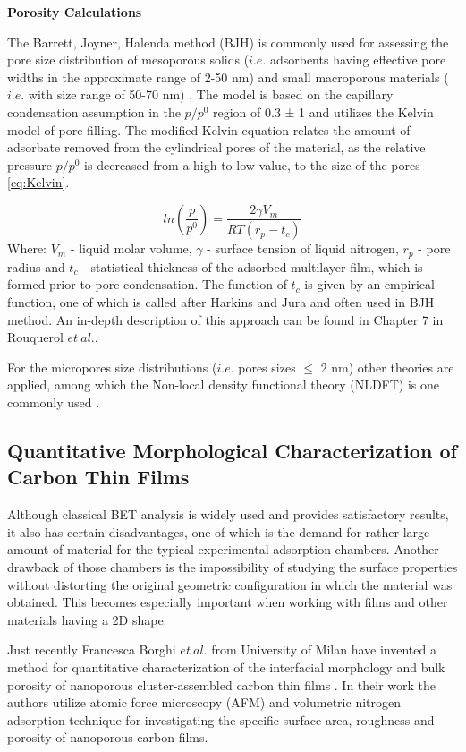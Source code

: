 \medskip
\textbf{Porosity Calculations}

The Barrett, Joyner, Halenda method (BJH) is commonly used for assessing the pore size distribution of mesoporous solids ($i.e.$ adsorbents having effective pore widths in the approximate range of 2-50 nm) and small macroporous materials ($i.e.$ with size range of 50-70 nm) . The model is based on the capillary condensation assumption in the $p/p^0$ region of 0.3 ± 1 and utilizes the Kelvin model of pore filling. The modified Kelvin equation \cite{ROUQUEROL1999165} relates the amount of adsorbate removed from the cylindrical pores of the material, as the relative pressure $p/p^0$ is decreased from a high to low value, to the size of the pores \ref{eq:Kelvin}. 

\begin{equation}
\label{eq:Kelvin}
    ln(\frac{p}{p^0})=\frac{2\gamma V_m}{RT(r_p - t_c)}
\end{equation}
Where: $V_m$ - liquid molar volume, $\gamma$ - surface tension of liquid nitrogen, $r_p$ - pore radius and $t_c$ - statistical thickness of the adsorbed multilayer film, which is formed prior to pore condensation.
The function of $t_c$ is given by an empirical function, one of which is called after Harkins and Jura and often used in BJH method. An in-depth description of this approach can be found in Chapter 7 in Rouquerol \textit{$et\:al.$}\cite{ROUQUEROL1999191}. 

For the micropores size distributions ($i.e.$ pores sizes $\le$ 2 nm) other theories are applied, among which the Non-local density functional theory (NLDFT) is one commonly used \cite{wu_jligorous_nodate}.

\subsection {Quantitative Morphological Characterization of Carbon Thin Films}
\label{Borghi-theory}

Although classical BET analysis is widely used and provides satisfactory results, it also has certain disadvantages, one of which is the demand for rather large amount of material for the typical experimental adsorption chambers. Another drawback of those chambers is the impossibility of studying the surface properties without distorting the original geometric configuration in which the material was obtained. This becomes especially important when working with films and other materials having a 2D shape. 

Just recently Francesca Borghi \textit{$et\:al.$} from University of Milan have invented a method for quantitative characterization of the interfacial morphology and bulk porosity of nanoporous cluster-assembled carbon thin films \cite{borghi_quantitative_2019}. In their work the authors utilize atomic force microscopy (AFM) and volumetric nitrogen adsorption technique for investigating the specific surface area, roughness and porosity of nanoporous carbon films. 


